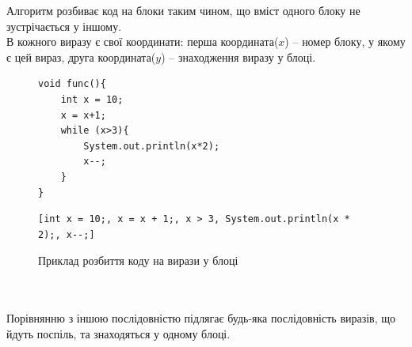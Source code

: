 \documentclass[a4paper, 14pt]{article}
\begin{document}
Алгоритм розбиває код на блоки таким чином, що вміст одного блоку не зустрічається у іншому. \\
В кожного виразу є свої координати: перша координата($x$) -- номер блоку, у якому є цей вираз, друга координата($y$) -- знаходження виразу у блоці.
\begin{figure}[h!]
\centering
\begin{minipage}{.4\textwidth}
\begin{lstlisting}[frame=none]
void func(){
	int x = 10;
	x = x+1;
	while (x>3){
		System.out.println(x*2);
		x--;
	}
}
\end{lstlisting}
\end{minipage}
\begin{minipage}{.5\textwidth}
\begin{lstlisting}[frame=none]
[int x = 10;, x = x + 1;, x > 3, System.out.println(x * 2);, x--;]
\end{lstlisting}
\end{minipage}
\caption{Приклад розбиття коду на вирази у блоці}
\end{figure} \\ \null \\
Порівнянню з іншою послідовністю підлягає будь-яка послідовність виразів, що йдуть поспіль, та знаходяться у одному блоці. \\
\end{document}

